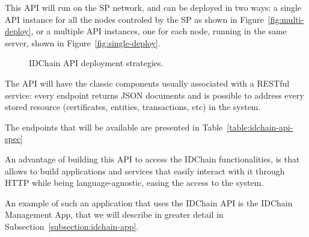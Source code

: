 This \ac{API} will run on the \ac{SP} network, and can be deployed in two ways: a single API instance for all the nodes controled by the \ac{SP} as shown in Figure~\ref{fig:multi-deploy}, or a multiple API instances, one for each node, running in the same server, shown in Figure~\ref{fig:single-deploy}.

\begin{figure}[htb]
  \centering
  \caption{IDChain API deployment strategies.}
\end{figure}

The \ac{API} will have the classic components usually associated with a RESTful service: every endpoint returns JSON documents and is possible to address every stored resource (certificates, entities, transactions, etc) in the system.

The endpoints that will be available are presented in Table~\ref{table:idchain-api-spec}

An advantage of building this \ac{API} to access the IDChain functionalities, is that allows to build applications and services that easily interact with it through \ac{HTTP} while being language-agnostic, easing the access to the system.

An example of such an application that uses the IDChain API is the IDChain Management App, that we will describe in greater detail in Subsection~\ref{subsection:idchain-app}.

